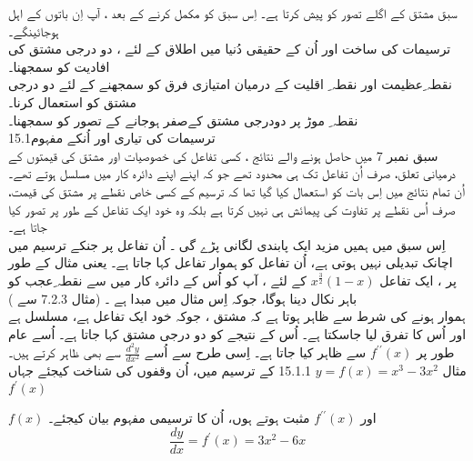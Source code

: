 سبق مشتق کے اگلے تصور کو پیش کرتا ہے۔ اِس سبق کو مکمل کرنے کے بعد ،    آپ اِن باتوں کے اہل ہوجائینگے۔\\
ترسیمات کی ساخت اور اُن کے حقیقی دُنیا میں اطلاق کے لئے ،  دو درجی   مشتق کی افادیت کو سمجھنا۔\\
نقطہ  ِعظیمت  اور نقطہ ِ اقلیت  کے درمیان امتیازی فرق کو سمجھنے کے لئے دو درجی مشتق کو استعمال کرنا۔\\
نقطہ  ِ موڑ   پر دودرجی مشتق کےصفر ہوجانے کے تصور کو سمجھنا۔ \\
 15.1ترسیمات کی تیاری اور اُنکے مفہوم\\
سبق نمبر 7  میں حاصل ہونے والے نتائج ،  کسی تفاعل کی خصوصیات اور مشتق کی قیمتوں کے درمیانی تعلق،  صرف اُن تفاعل تک ہی محدود تھے جو کہ اپنے اپنے دائرہ کار   میں مسلسل   ہوتے تھے۔   اُن تمام نتائج میں اِس بات کو استعمال کیا گیا تھا کہ ترسیم کے کسی خاص نقطے پر مشتق کی قیمت،   صرف اُس نقطے پر تفاوت    کی پیمائش ہی نہیں کرتا ہے بلکہ وہ خود ایک تفاعل کے طور پر تصور کیا جاتا ہے۔ \\
اِس سبق میں ہمیں مزید ایک پابندی لگانی پڑے گی ۔    اُن تفاعل پر جنکے ترسیم میں اچانک تبدیلی نہیں ہوتی ہے،    اُن تفاعل کو ہموار تفاعل    کہا  جاتا ہے۔   یعنی مثال کے طور پر ،   ایک تفاعل   
\(x^{\frac{3}{2}}\left(1-x\right) \)
کے لئے ،  آپ کو اُس کے دائرہ کار میں سے  نقطہ ِعجب       کو باہر نکال دینا ہوگا،  جوکہ اِس مثال میں مبدا ہے ۔  (مثال   7.2.3 سے )\\
ہموار ہونے کی شرط سے ظاہر ہوتا ہے کہ مشتق ،   جوکہ  خود ایک تفاعل ہے،  مسلسل ہے   اور اُس کا تفرق لیا جاسکتا ہے۔ اُس کے نتیجے کو  دو  درجی مشتق  کہا جاتا ہے۔    اُسے عام طور پر 
\(f^{\prime\prime}\left(x\right) \)
  سے ظاہر کیا جاتا ہے۔  اِسی طرح سے اُسے  
 \(\frac{d^{2}y}{dx^{2}} \)
   سے بھی ظاہر کرتے ہیں۔ \\
مثال   
\(y=f\left(x\right)=x^{3}-3x^{2} \)
   15.1.1     کے ترسیم میں،  اُن وقفوں کی شناخت کیجئے جہاں 
\(f^{\prime}\left(x\right) \)
   
\(f\left(x\right) \)
    اور 
\(f^{\prime\prime}\left(x\right) \)
     مثبت ہوتے ہوں،  اُن کا ترسیمی مفہوم بیان کیجئے۔ \\
\[\frac{dy}{dx}=f^{\prime}\left(x\right)=3x^{2}-6x \]

